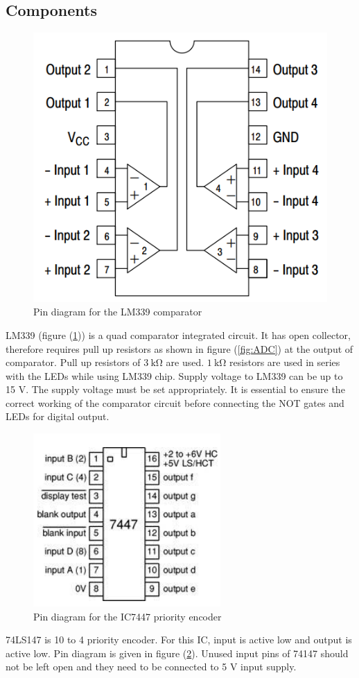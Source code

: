 \documentclass[%
 reprint,
nofootinbib,
 amsmath,amssymb,
 aps,
floatfix,
]{revtex4-2}
\begin{document}
    \subsection{Components}
    \begin{figure}
        \centering
        \includegraphics[scale = 0.60]{Figures/lm339.png}
        \caption{Pin diagram for the LM339 comparator}
        \label{fig:339}
    \end{figure}
    LM339 (figure (\ref{fig:339})) is a quad comparator integrated circuit. It has open collector, therefore requires pull up resistors as shown in figure (\ref{fig:ADC}) at the output of comparator. Pull up resistors of $\SI{3}{\kilo \ohm}$ are used. $\SI{1}{\kilo \ohm}$ resistors are used in series with the LEDs while using LM339 chip. Supply voltage to LM339 can be up to 15 V. The supply voltage must be set appropriately. It is essential to ensure the correct working of the comparator circuit before connecting the NOT gates and LEDs for digital output.
    \begin{figure}
        \centering
        \includegraphics[scale = 1]{Figures/real7447.png}
        \caption{Pin diagram for the IC7447 priority encoder}
        \label{fig:7447}
    \end{figure}
    \par
    74LS147 is 10 to 4 priority encoder. For this IC, input is active low and output is active low. Pin diagram is given in figure (\ref{fig:7447}). Unused input pins of 74147 should not be left open and they need to be connected to 5 V input supply.
\end{document}
